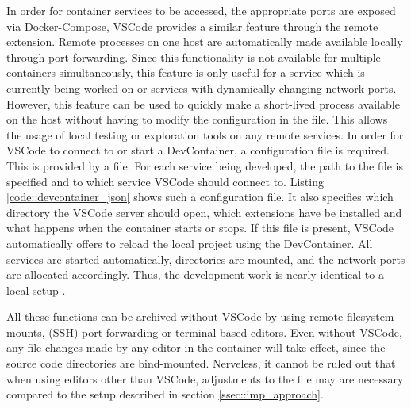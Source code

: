         In order for container services to be accessed, the appropriate ports are exposed via Docker-Compose, \ac{VSCode} provides a similar feature through the remote extension. Remote processes on one host are automatically made available locally through port forwarding. Since this functionality is not available for multiple containers simultaneously, this feature is only useful for a service which is currently being worked on or services with dynamically changing network ports. However, this feature can be used to quickly make a short-lived process available on the host without having to modify the configuration in the  file. This allows the usage of local testing or exploration tools on any remote services.\newline
        In order for \ac{VSCode} to connect to or start a DevContainer, a configuration file is required. This is provided by a  file. For each service being developed, the path to the  file is specified and to which service \ac{VSCode} should connect to. Listing \ref{code::devcontainer_json} shows such a configuration file. It also specifies which directory the \ac{VSCode} server should open, which extensions have be installed and what happens when the container starts or stops. If this file is present, \ac{VSCode} automatically offers to reload the local project using the DevContainer. All services are started automatically, directories are mounted, and the network ports are allocated accordingly. Thus, the development work is nearly identical to a local setup \cite{vscodedevcontainer}.\newline
        
        All these functions can be archived without \ac{VSCode} by using remote filesystem mounts, (\ac{SSH}) port-forwarding or terminal based editors. Even without VSCode, any file changes made by any editor in the container will take effect, since the source code directories are bind-mounted. Nerveless, it cannot be ruled out that when using editors other than \ac{VSCode}, adjustments to the  file may are necessary compared to the setup described in section \ref{ssec::imp_approach}.


